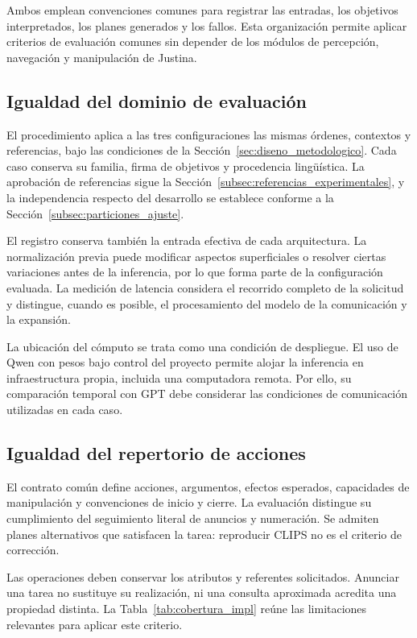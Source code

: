 Ambos emplean convenciones comunes para registrar las entradas,
los objetivos interpretados, los planes generados y los fallos.
Esta organización permite aplicar criterios de evaluación comunes
sin depender de los módulos de percepción, navegación y manipulación
de Justina.

\subsection{Igualdad del dominio de evaluación}

El procedimiento aplica a las tres configuraciones las mismas órdenes, contextos y referencias, bajo las condiciones de la Sección~\ref{sec:diseno_metodologico}. Cada caso conserva su familia, firma de objetivos y procedencia lingüística. La aprobación de referencias sigue la Sección~\ref{subsec:referencias_experimentales}, y la independencia respecto del desarrollo se establece conforme a la Sección~\ref{subsec:particiones_ajuste}.

El registro conserva también la entrada efectiva de cada arquitectura. La
normalización previa puede modificar aspectos superficiales o resolver
ciertas variaciones antes de la inferencia, por lo que forma parte de
la configuración evaluada. La medición de latencia considera el
recorrido completo de la solicitud y distingue, cuando es posible,
el procesamiento del modelo de la comunicación y la expansión.

La ubicación del cómputo se trata como una condición de despliegue.
El uso de Qwen con pesos bajo control del proyecto permite alojar la
inferencia en infraestructura propia, incluida una computadora remota.
Por ello, su comparación temporal con GPT debe considerar las
condiciones de comunicación utilizadas en cada caso.

\subsection{Igualdad del repertorio de acciones}

El contrato común define acciones, argumentos, efectos esperados, capacidades de manipulación y convenciones de inicio y cierre. La evaluación distingue su cumplimiento del seguimiento literal de anuncios y numeración. Se admiten planes alternativos que satisfacen la tarea: reproducir CLIPS no es el criterio de corrección.

Las operaciones deben conservar los atributos y referentes solicitados. Anunciar una tarea no sustituye su realización, ni una consulta aproximada acredita una propiedad distinta. La Tabla~\ref{tab:cobertura_impl} reúne las limitaciones relevantes para aplicar este criterio.

